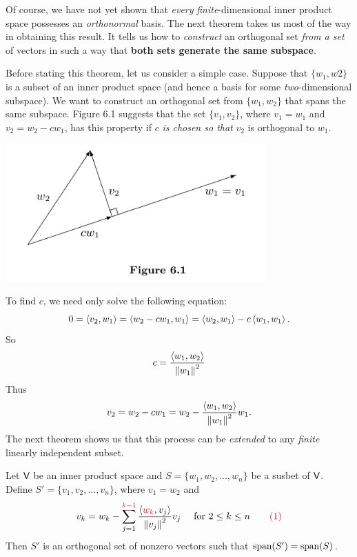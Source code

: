 \begin{remark} \label{remark 6.2.2}
Of course, we have not yet shown that \emph{every} \emph{finite}-dimensional inner product space possesses an \emph{orthonormal} basis.
The next theorem takes us most of the way in obtaining this result.
It tells us how to \emph{construct} an orthogonal set \emph{from a \LID{} set} of vectors in such a way that \textbf{both sets generate the same subspace}.

Before stating this theorem, let us consider a simple case.
Suppose that \(\{ w_1, w2 \}\) is a \LID{} subset of an inner product space (and hence a basis for some \emph{two}-dimensional subspace).
We want to construct an orthogonal set from \(\{ w_1, w_2 \}\) that spans the same subspace.
Figure 6.1 suggests that the set \(\{ v_1, v_2 \}\), where \(v_1 = w_1\) and \(v_2 = w_2 - cw_1\), has this property if \(c\) \emph{is chosen so that} \(v_2\) is orthogonal to \(w_1\).

\includegraphics[width=10cm]{images/figure-6-1.png}

To find \(c\), we need only solve the following equation:
\[
    0 = \left< v_2, w_1 \right> = \left< w_2 - cw_1, w_1 \right> = \left< w_2, w_1 \right> - c \left< w_1, w_1 \right>.
\]
So
\[
    c = \frac{\left< w_1, w_2 \right>}{ \left\lVert w_1\right\rVert^2 }
\]
Thus
\[
    v_2 = w_2 - c w_1 = w_2 - \frac{\left< w_1, w_2 \right>}{ \left\lVert w_1\right\rVert^2 } w_1.
\]
The next theorem shows us that this process can be \emph{extended} to any \emph{finite} linearly independent subset.
\end{remark}

\begin{theorem}  \label{thm 6.4}
Let \(\textsf{V}\) be an inner product space and \(S = \{ w_1, w_2, ..., w_n \}\) be a \LID{} susbet of \(\textsf{V}\).
Define \(S' = \{ v_1, v_2, ..., v_n \}\), where \(v_1 = w_2\) and
\[
    v_k = w_k - \sum_{j = 1}^{\RED{k - 1}} \frac{\LG \RED{w_k}, v_j \RG}{\norm{v_j}^2} v_j \quad \text{ for } 2 \le k \le n \quad \quad \MAROON{(1)}
\]
Then \(S'\) is an orthogonal set of nonzero vectors such that \(\operatorname{span}(S') = \operatorname{span}(S)\).
\end{theorem}

